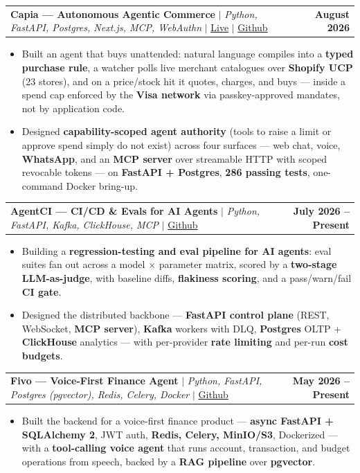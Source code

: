 \documentclass[letterpaper,11pt]{article}
\makeatletter
\newcommand{\resumeItem}[1]{
  \item\small{
    {#1 \vspace{-2pt}}
  }
}
\newcommand{\resumeProjectHeading}[2]{
    \item
    \begin{tabular*}{1.001\textwidth}{l@{\extracolsep{\fill}}r}
      \small#1 & \textbf{\small #2}\\
    \end{tabular*}\vspace{-7pt}
}
\newcommand{\resumeItemListStart}{\begin{itemize}}
\newcommand{\resumeItemListEnd}{\end{itemize}\vspace{-5pt}}
\makeatother
\begin{document}
    \resumeProjectHeading
      {\textbf{Capia --- Autonomous Agentic Commerce} $|$ \emph{Python, FastAPI, Postgres, Next.js, MCP, WebAuthn} $|$ \href{https://capia-ai.netlify.app}{Live} $|$ \href{https://github.com/shrinish123/capia}{Github}}{August 2026}
      \resumeItemListStart
        \resumeItem{Built an agent that buys unattended: natural language compiles into a \textbf{typed purchase rule}, a watcher polls live merchant catalogues over \textbf{Shopify UCP} (23 stores), and on a price/stock hit it quotes, charges, and buys --- inside a spend cap enforced by the \textbf{Visa network} via passkey-approved mandates, not by application code.}
        \resumeItem{Designed \textbf{capability-scoped agent authority} (tools to raise a limit or approve spend simply do not exist) across four surfaces --- web chat, voice, \textbf{WhatsApp}, and an \textbf{MCP server} over streamable HTTP with scoped revocable tokens --- on \textbf{FastAPI + Postgres}, \textbf{286 passing tests}, one-command Docker bring-up.}
      \resumeItemListEnd
      \vspace{-13pt}

    \resumeProjectHeading
      {\textbf{AgentCI --- CI/CD \& Evals for AI Agents} $|$ \emph{Python, FastAPI, Kafka, ClickHouse, MCP} $|$ \href{https://github.com/shrinish123/agentci}{Github}}{July 2026 -- Present}
      \resumeItemListStart
        \resumeItem{Building a \textbf{regression-testing and eval pipeline for AI agents}: eval suites fan out across a model $\times$ parameter matrix, scored by a \textbf{two-stage LLM-as-judge}, with baseline diffs, \textbf{flakiness scoring}, and a pass/warn/fail \textbf{CI gate}.}
        \resumeItem{Designed the distributed backbone --- \textbf{FastAPI control plane} (REST, WebSocket, \textbf{MCP server}), \textbf{Kafka} workers with DLQ, \textbf{Postgres} OLTP + \textbf{ClickHouse} analytics --- with per-provider \textbf{rate limiting} and per-run \textbf{cost budgets}.}
      \resumeItemListEnd
      \vspace{-13pt}

    \resumeProjectHeading
      {\textbf{Fivo --- Voice-First Finance Agent} $|$ \emph{Python, FastAPI, Postgres (pgvector), Redis, Celery, Docker} $|$ \href{https://github.com/shrinish123/fivo}{Github}}{May 2026 -- Present}
      \resumeItemListStart
        \resumeItem{Built the backend for a voice-first finance product --- \textbf{async FastAPI + SQLAlchemy 2}, JWT auth, \textbf{Redis, Celery, MinIO/S3}, Dockerized --- with a \textbf{tool-calling voice agent} that runs account, transaction, and budget operations from speech, backed by a \textbf{RAG pipeline} over \textbf{pgvector}.}
      \resumeItemListEnd
\end{document}
